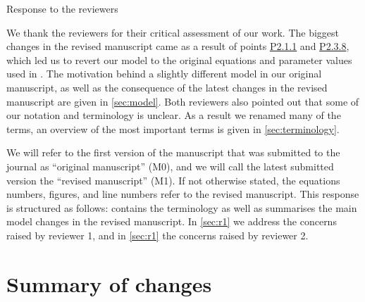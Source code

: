 \documentclass[utf8]{article}
\newcounter{point}[section]
\begin{document}

\begin{center}
	\Large Response to the reviewers
\end{center}
We thank the reviewers for their critical assessment of our work.
The biggest changes in the revised manuscript came as a result of points \hyperref[p:biol]{P2.1.1} and \hyperref[p:gstar]{P2.3.8}, which led us to revert our model to the original equations and parameter values used in \cite{bose2011}.
The motivation behind a slightly different model in our original manuscript, as well as the consequence of the latest changes in the revised manuscript are given in \cref{sec:model}.
Both reviewers also pointed out that some of our notation and terminology is unclear.
As a result we renamed many of the terms, an overview of the most important terms is given in \cref{sec:terminology}.

We will refer to the first version of the manuscript that was submitted to the journal as ``original manuscript'' (M0), and we will call the latest submitted version the ``revised manuscript'' (M1).
If not otherwise stated, the equations numbers, figures, and line numbers refer to the revised manuscript.
This response is structured as follows:
 contains the terminology as well as summarises the main model changes in the revised manuscript.
In \cref{sec:r1} we address the concerns raised by reviewer 1, and in \cref{sec:r1} the concerns raised by reviewer 2.


\section{Summary of changes}
\label{sec:sum}
\end{document}
